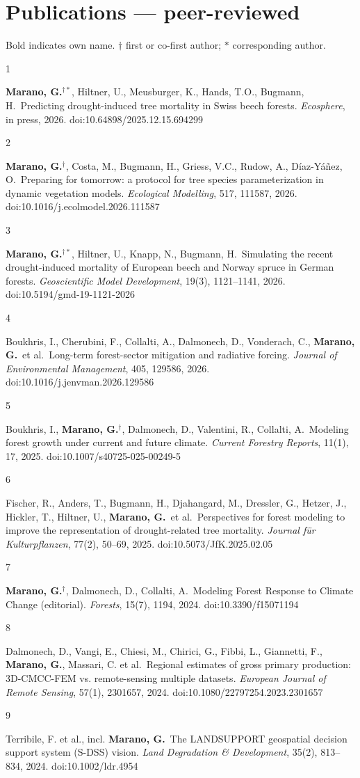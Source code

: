 \documentclass[10pt,a4paper]{article}
\newcommand{\pubitem}[3]{%
  \noindent\begin{minipage}[t]{0.6cm}\raggedright\footnotesize\color{muted}#1\end{minipage}%
  \begin{minipage}[t]{\dimexpr\linewidth-0.6cm\relax}\raggedright\small #2\ {\color{inksoft}#3}\end{minipage}\par\vspace{4pt}}
\newcommand{\me}{\textbf{Marano, G.}}
\begin{document}
\section*{Publications --- peer-reviewed}
{\footnotesize\color{muted}Bold indicates own name. $\dagger$ first or co-first author; $\ast$ corresponding author.}\\[5pt]
\pubitem{1}{\me$^{\dagger\ast}$, Hiltner, U., Meusburger, K., Hands, T.O., Bugmann, H.}{Predicting drought-induced tree mortality in Swiss beech forests. \emph{Ecosphere}, in press, 2026. doi:10.64898/2025.12.15.694299}
\pubitem{2}{\me$^{\dagger}$, Costa, M., Bugmann, H., Griess, V.C., Rudow, A., D\'iaz-Y\'a\~nez, O.}{Preparing for tomorrow: a protocol for tree species parameterization in dynamic vegetation models. \emph{Ecological Modelling}, 517, 111587, 2026. doi:10.1016/j.ecolmodel.2026.111587}
\pubitem{3}{\me$^{\dagger\ast}$, Hiltner, U., Knapp, N., Bugmann, H.}{Simulating the recent drought-induced mortality of European beech and Norway spruce in German forests. \emph{Geoscientific Model Development}, 19(3), 1121--1141, 2026. doi:10.5194/gmd-19-1121-2026}
\pubitem{4}{Boukhris, I., Cherubini, F., Collalti, A., Dalmonech, D., Vonderach, C., \me\ et al.}{Long-term forest-sector mitigation and radiative forcing. \emph{Journal of Environmental Management}, 405, 129586, 2026. doi:10.1016/j.jenvman.2026.129586}
\pubitem{5}{Boukhris, I., \me$^{\dagger}$, Dalmonech, D., Valentini, R., Collalti, A.}{Modeling forest growth under current and future climate. \emph{Current Forestry Reports}, 11(1), 17, 2025. doi:10.1007/s40725-025-00249-5}
\pubitem{6}{Fischer, R., Anders, T., Bugmann, H., Djahangard, M., Dressler, G., Hetzer, J., Hickler, T., Hiltner, U., \me\ et al.}{Perspectives for forest modeling to improve the representation of drought-related tree mortality. \emph{Journal f\"ur Kulturpflanzen}, 77(2), 50--69, 2025. doi:10.5073/JfK.2025.02.05}
\pubitem{7}{\me$^{\dagger}$, Dalmonech, D., Collalti, A.}{Modeling Forest Response to Climate Change (editorial). \emph{Forests}, 15(7), 1194, 2024. doi:10.3390/f15071194}
\pubitem{8}{Dalmonech, D., Vangi, E., Chiesi, M., Chirici, G., Fibbi, L., Giannetti, F., \me, Massari, C. et al.}{Regional estimates of gross primary production: 3D-CMCC-FEM vs. remote-sensing multiple datasets. \emph{European Journal of Remote Sensing}, 57(1), 2301657, 2024. doi:10.1080/22797254.2023.2301657}
\pubitem{9}{Terribile, F. et al., incl. \me}{The LANDSUPPORT geospatial decision support system (S-DSS) vision. \emph{Land Degradation \& Development}, 35(2), 813--834, 2024. doi:10.1002/ldr.4954}
\end{document}
